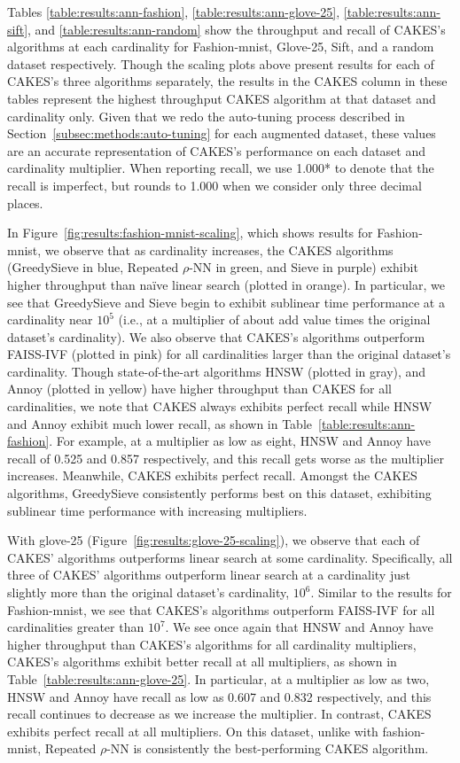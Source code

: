 Tables \ref{table:results:ann-fashion}, \ref{table:results:ann-glove-25}, \ref{table:results:ann-sift}, and \ref{table:results:ann-random} show the throughput and recall of CAKES's algorithms at each cardinality for  Fashion-mnist, Glove-25, Sift, and a random dataset respectively. Though the scaling plots above present results for each of CAKES's three algorithms separately, the results in the CAKES column in these tables represent the highest throughput CAKES algorithm at that dataset and cardinality only. 
Given that we redo the auto-tuning process described in Section~\ref{subsec:methods:auto-tuning} for each augmented dataset, these values are an accurate representation of CAKES's performance on each dataset and cardinality multiplier. 
When reporting recall, we use 1.000* to denote that the recall is imperfect, but rounds to 1.000 when we consider only three decimal places.

In Figure~\ref{fig:results:fashion-mnist-scaling}, which shows results for Fashion-mnist, we observe that as cardinality increases, the CAKES algorithms (GreedySieve in blue, Repeated $\rho$-NN in green, and Sieve in purple) exhibit higher throughput than na\"{i}ve linear search (plotted in orange).
In particular, we see that GreedySieve and Sieve begin to exhibit sublinear time performance at a cardinality near $10^5$ (i.e., at a multiplier of about {\color{red} add value} times the original dataset's cardinality). 
We also observe that CAKES's algorithms outperform FAISS-IVF (plotted in pink) for all cardinalities larger than the original dataset's cardinality.
Though state-of-the-art algorithms HNSW (plotted in gray), and Annoy (plotted in yellow) have higher throughput than CAKES for all cardinalities, we note that CAKES always exhibits perfect recall while HNSW and Annoy exhibit much lower recall, as shown in Table~\ref{table:results:ann-fashion}.
For example, at a multiplier as low as eight, HNSW and Annoy have recall of 0.525 and 0.857 respectively,
and this recall gets worse as the multiplier increases.
Meanwhile, CAKES exhibits perfect recall.
Amongst the CAKES algorithms, GreedySieve consistently performs best on this dataset, exhibiting sublinear time performance with increasing multipliers.


With glove-25 (Figure~\ref{fig:results:glove-25-scaling}), we observe that each of CAKES' algorithms outperforms linear search at some cardinality.
Specifically, all three of CAKES' algorithms outperform linear search at a cardinality just slightly more than the original dataset's cardinality, $10^6$.
Similar to the results for Fashion-mnist, we see that CAKES's algorithms outperform FAISS-IVF for all cardinalities greater than $10^7$.
We see once again that HNSW and Annoy have higher throughput than CAKES's algorithms for all cardinality multipliers, CAKES's algorithms exhibit better recall at all multipliers, as shown in Table~\ref{table:results:ann-glove-25}.
In particular, at a multiplier as low as two, HNSW and Annoy have recall as low as 0.607 and 0.832 respectively, and this recall continues to decrease as we increase the multiplier.
In contrast, CAKES exhibits perfect recall at all multipliers.
On this dataset, unlike with fashion-mnist, Repeated $\rho$-NN is consistently the best-performing CAKES algorithm. 


